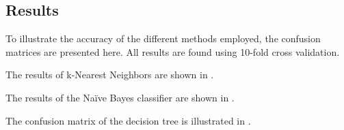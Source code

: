 \subsection{Results}
To illustrate the accuracy of the different methods employed, the confusion matrices are presented here. All results are found using 10-fold cross validation.

The results of k-Nearest Neighbors are shown in .

\begin{table}[H]
	\centering
	\caption{Confusion matrix of the k-Nearest Neighbors classifier with Manhattan distance}
	\label{tab:mat-knn}
\end{table}

The results of the Na\"ive Bayes classifier are shown in .
\begin{table}[H]
	\centering
	\caption{Confusion matrix of the Na\"ive Bayes classifier}
	\label{tab:mat-nb}
\end{table}

The confusion matrix of the decision tree is illustrated in .
\begin{table}[H]
	\centering
	\caption{Confusion matrix of the decision tree}
	\label{tab:mat-tree}
\end{table}

